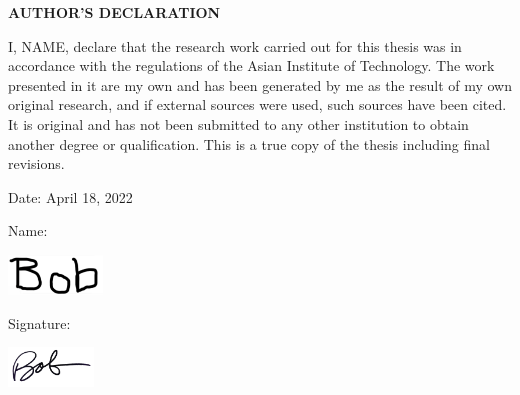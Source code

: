 \begin{center}
    \large{\bf AUTHOR'S DECLARATION}
\end{center}

I, NAME, declare that the research work carried out for this thesis was in accordance with the regulations of the Asian Institute of Technology. The work presented in it are my own and has been generated by me as the result of my own original research, and if external sources were used, such sources have been cited. It is original and has not been submitted to any other institution to obtain another degree or qualification. This is a true copy of the thesis including final revisions.

Date: April 18, 2022

Name: 

\vspace{-3em}\hspace{4em}\includegraphics*[height=30pt]{figures/name.png}

Signature: 

\vspace{-3em}\hspace{5.5em}\includegraphics[height=30pt]{figures/signature.png}
